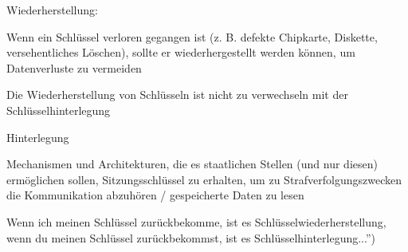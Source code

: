 \documentclass[a4paper]{article}
\begin{document}
\begin{multicols}{3}
\begin{itemize*}
            \item Wiederherstellung:
            \begin{itemize*}
                  \item Wenn ein Schlüssel verloren gegangen ist (z. B. defekte Chipkarte, Diskette, versehentliches Löschen), sollte er wiederhergestellt werden können, um Datenverluste zu vermeiden
                  \item Die Wiederherstellung von Schlüsseln ist nicht zu verwechseln mit der Schlüsselhinterlegung
            \end{itemize*}
            \item Hinterlegung
            \begin{itemize*}
                  \item Mechanismen und Architekturen, die es staatlichen Stellen (und nur diesen) ermöglichen sollen, Sitzungsschlüssel zu erhalten, um zu Strafverfolgungszwecken die Kommunikation abzuhören / gespeicherte Daten zu lesen
                  \item Wenn ich meinen Schlüssel zurückbekomme, ist es Schlüsselwiederherstellung, wenn du meinen Schlüssel zurückbekommst, ist es Schlüsselhinterlegung...'')
            \end{itemize*}
      \end{itemize*}


\end{multicols}
\end{document}
